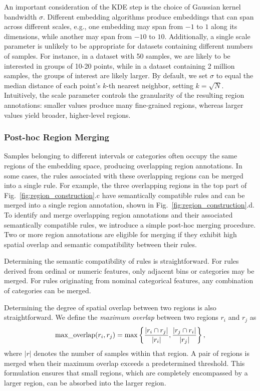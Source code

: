 \documentclass[lettersize,journal]{IEEEtran}
\begin{document}
An important consideration of the KDE step is the choice of Gaussian kernel bandwidth $\sigma$.
Different embedding algorithms produce embeddings that can span across different scales, e.g., one embedding may span from $-1$ to $1$ along its dimensions, while another may span from $-10$ to $10$.
Additionally, a single scale parameter is unlikely to be appropriate for datasets containing different numbers of samples. For instance, in a dataset with 50 samples, we are likely to be interested in groups of 10-20 points, while in a dataset containing 2 million samples, the groups of interest are likely larger.
By default, we set $\sigma$ to equal the median distance of each point's $k$-th nearest neighbor, setting $k=\sqrt{N}$.
Intuitively, the scale parameter controls the granularity of the resulting region annotations: smaller values produce many fine-grained regions, whereas larger values yield broader, higher-level regions.

\subsubsection{Post-hoc Region Merging}
\label{sec:post-hoc-merge}

Samples belonging to different intervals or categories often occupy the same regions of the embedding space, producing overlapping region annotations.
In some cases, the rules associated with these overlapping regions can be merged into a single rule.
For example, the three overlapping regions in the top part of Fig.~\ref{fig:region_construction}.c have semantically compatible rules and can be merged into a single region annotation, shown in Fig.~\ref{fig:region_construction}.d.
To identify and merge overlapping region annotations and their associated semantically compatible rules, we introduce a simple post-hoc merging procedure.
Two or more region annotations are eligible for merging if they exhibit high spatial overlap and semantic compatibility between their rules.

Determining the semantic compatibility of rules is straightforward. For rules derived from ordinal or numeric features, only adjacent bins or categories may be merged. For rules originating from nominal categorical features, any combination of categories can be merged.

Determining the degree of spatial overlap between two regions is also straightforward.
We define the \textit{maximum overlap} between two regions $r_i$ and $r_j$ as
\begin{equation}
\text{max\_overlap}(r_i, r_j) = \max \left \{ \frac{|r_i \cap r_j|}{|r_i|}, \frac{|r_j \cap r_i|}{|r_j|} \right \}, \notag
\end{equation}
where $|r|$ denotes the number of samples within that region.
A pair of regions is merged when their maximum overlap exceeds a predetermined threshold.
This formulation ensures that small regions, which are completely encompassed by a larger region, can be absorbed into the larger region.
\end{document}
